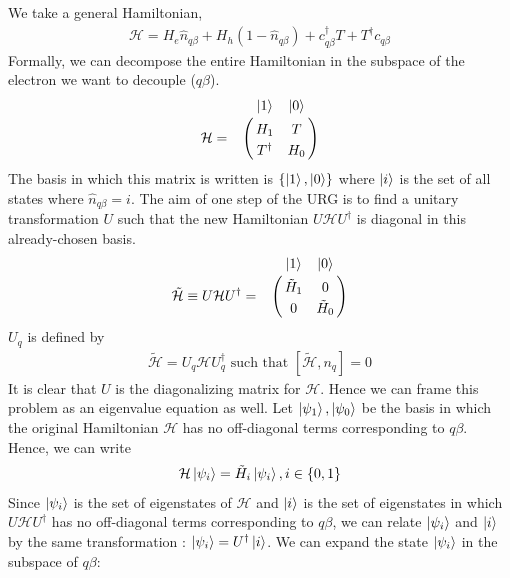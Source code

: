 We take a general Hamiltonian,
\begin{equation}\begin{aligned}
	\mathcal{H} = H_e \hat n_{q\beta} + H_h \left(1 - \hat n_{q\beta}\right) + c^\dagger_{q\beta}T + T^\dagger c_{q\beta}
\end{aligned}\end{equation}
Formally, we can decompose the entire Hamiltonian in the subspace of the electron we want to decouple (\(q\beta\)).
\begin{equation}\begin{aligned}
	\label{matham}
\mathcal{H} = \bordermatrix{~ & \ket{1} & \ket{0} \cr
              & H_1 & T \cr
              & T^\dagger & H_0 \cr}
\end{aligned}\end{equation}
The basis in which this matrix is written is \(\left\{\ket{1},\ket{0}\right\}\) where \(\ket{i}\) is the set of all states where \(\hat n_{q\beta}=i\). The aim of one step of the URG is to find a unitary transformation \(U\) such that the new Hamiltonian \(U \mathcal{H} U^\dagger\) is diagonal in this already-chosen basis.
\begin{equation}\begin{aligned}
	\tilde{\mathcal{H}} \equiv U \mathcal{H} U^\dagger = \bordermatrix{~ & \ket{1} & \ket{0} \cr
              & \tilde H_1 & 0 \cr
              & 0 & \tilde H_0 \cr}
\end{aligned}\end{equation}
\(U_q\) is defined by
\begin{equation}\begin{aligned}
	\tilde{\mathcal{H}} = U_q \mathcal{H} U^\dagger_q \text{   such that  } \left[\tilde{\mathcal{H}},n_q\right] = 0
\end{aligned}\end{equation}
It is clear that \(U\) is the diagonalizing matrix for \(\mathcal{H}\). Hence we can frame this problem as an eigenvalue equation as well. Let \(\ket{\psi_1},\ket{\psi_0}\) be the basis in which the original Hamiltonian \(\mathcal{H}\) has no off-diagonal terms corresponding to \(q\beta\). Hence, we can write
\begin{equation}\begin{aligned}
	\label{diageq}
    \mathcal{H} \ket{\psi_i} = \tilde H_i\ket{\psi_i}, i\in\left\{0,1\right\}
\end{aligned}\end{equation}
Since \(\ket{\psi_i}\) is the set of eigenstates of \(\mathcal{H}\) and \(\ket{i}\) is the set of eigenstates in which \(U\mathcal{H} U^\dagger\) has no off-diagonal terms corresponding to \(q\beta\), we can relate \(\ket{\psi_i}\) and \(\ket{i}\) by the same transformation : \(\ket{\psi_i} = U^\dagger\ket{i}\). We can expand the state \(\ket{\psi_i}\) in the subspace of \(q\beta\):
